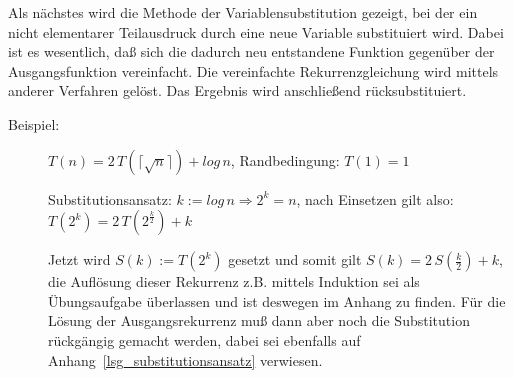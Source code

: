 \documentclass{scrreprt}%
\theoremstyle{break}
\begin{document}
Als nächstes wird die Methode der Variablensubstitution gezeigt,
bei der ein nicht elementarer Teilausdruck durch eine neue Variable substituiert wird. Dabei ist es wesentlich, daß
sich die dadurch neu entstandene Funktion gegenüber der Ausgangsfunktion vereinfacht. Die vereinfachte Rekurrenzgleichung wird
mittels anderer Verfahren gelöst. Das Ergebnis wird anschließend rücksubstituiert.
	\begin{description}
		\item [Beispiel:] $T(n) = 2\, T(\lceil\sqrt{n}\rceil) + log\,n$, Randbedingung: $T(1)=1$

		Substitutionsansatz: $k:=log\,n \Rightarrow 2^k=n$, nach Einsetzen gilt also: $T(2^k) = 2\, T(2^{\frac{k}{2}})+k$
		
		Jetzt wird $S(k) := T(2^k)$ gesetzt und somit gilt $S(k) = 2\, S\left(\frac{k}{2}\right)+k$, die Auflösung dieser
		Rekurrenz z.B. mittels Induktion sei als Übungsaufgabe überlassen und ist deswegen im Anhang zu finden. 
		Für die Lösung der Ausgangsrekurrenz muß dann aber noch die Substitution rückgängig gemacht werden, dabei sei
		ebenfalls auf Anhang~\ref{lsg_substitutionsansatz} verwiesen. 
	\end{description}	
\end{document}
